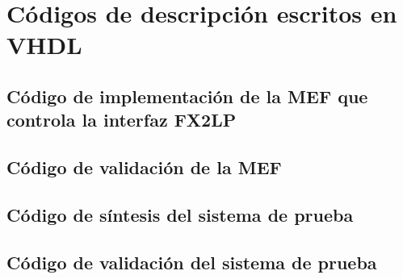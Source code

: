 \chapter{Códigos de descripción escritos en VHDL}
\label{ap:vhdl}
	\section{Código de implementación de la MEF que controla la interfaz FX2LP}
	
	
	\section{Código de validación de la MEF}
	
	
	\section{Código de síntesis del sistema de prueba}
	


	\section{Código de validación del sistema de prueba}
	
	